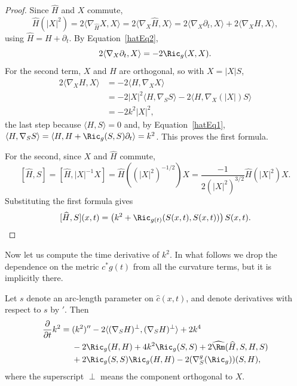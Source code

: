 \begin{proof}
Since $\widehat H$ and $X$ commute,
$$\widehat H(|X|^2)=2\langle\nabla_{\widehat H}X,X\rangle=2\langle\nabla_X\widehat H,X\rangle
=2\langle\nabla_X\partial_t,X\rangle+2\langle\nabla_XH,X\rangle,$$
using $\widehat H=H+\partial_t$. By Equation~\eqref{hatEq2},
$$2\langle\nabla_X\partial_t,X\rangle=-2\Ric_g(X,X).$$
For the second term, $X$ and $H$ are orthogonal, so with $X=|X|S$,
\begin{align*}
2\langle\nabla_XH,X\rangle & = -2\langle H,\nabla_XX\rangle \\
 & = -2|X|^2\langle H,\nabla_SS\rangle-2\langle H,\nabla_X(|X|)S\rangle \\
 & = -2k^2|X|^2,
\end{align*}
the last step because $\langle H,S\rangle=0$ and, by
Equation~\eqref{hatEq1}, $\langle H,\nabla_SS\rangle=\langle H,H+\Ric_g(S,S)\partial_t\rangle=k^2$.
This proves the first formula.

For the second, since $X$ and $\widehat H$ commute,
$$[\widehat H,S]=[\widehat H,|X|^{-1}X]=\widehat H\left((|X|^2)^{-1/2}\right)X
=\frac{-1}{2\left(|X|^2\right)^{3/2}}\widehat H(|X|^2)X.$$
Substituting the first formula gives
$$[\widehat H,S](x,t)=\left(k^2+\Ric_{g(t)}(S(x,t),S(x,t))\right)S(x,t).$$
\end{proof}


Now let us compute the time derivative of $k^2$. In what follows we drop the
dependence on the metric $c^*g(t)$ from all the curvature terms, but it is
implicitly there.

\begin{lemma}
\label{lem:curve-shrinking-curvature-evolution}
\label{2ndcurvshr}
Let $s$ denote an arc-length parameter on $\hat c(x,t)$, and denote derivatives
with respect to $s$ by $'$. Then
\begin{align*}
\frac{\partial }{\partial t}k^2 = {} & (k^2)''-2\langle(\nabla_SH)^\perp,(\nabla_SH)^\perp\rangle+2k^4 \\
 & -2\Ric_g(H,H)+4k^2\Ric_g(S,S)+2\widehat{\Rm}(\widehat H,S,H,S) \\
 & +2\Ric_g(S,S)\Ric_g(H,H)-2(\nabla^g_S(\Ric_g))(S,H),
\end{align*}
where the superscript $\perp$ means the component orthogonal to $X$.
\end{lemma}

